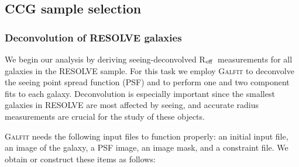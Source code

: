 \documentclass[iop,apj]{emulateapj}
\newcommand{\Reff}{R$_{\rm eff}$}
\begin{document}
\subsection{CCG sample selection}

\subsubsection{Deconvolution of RESOLVE galaxies}
\label{deconv}

  We begin our analysis by deriving seeing-deconvolved \Reff\ measurements for all galaxies in the RESOLVE sample. For this task we employ \textsc{Galfit} \citep{Peng2002} to deconvolve the seeing point spread function (PSF) and to perform one and two component fits to each galaxy. Deconvolution is especially important since the smallest galaxies in RESOLVE are most affected by seeing, and accurate radius measurements are crucial for the study of these objects. 

\textsc{Galfit} needs the following input files to function properly: an initial input file, an image of the galaxy, a PSF image, an image mask, and a constraint file. We obtain or construct these items as follows:
\end{document}
